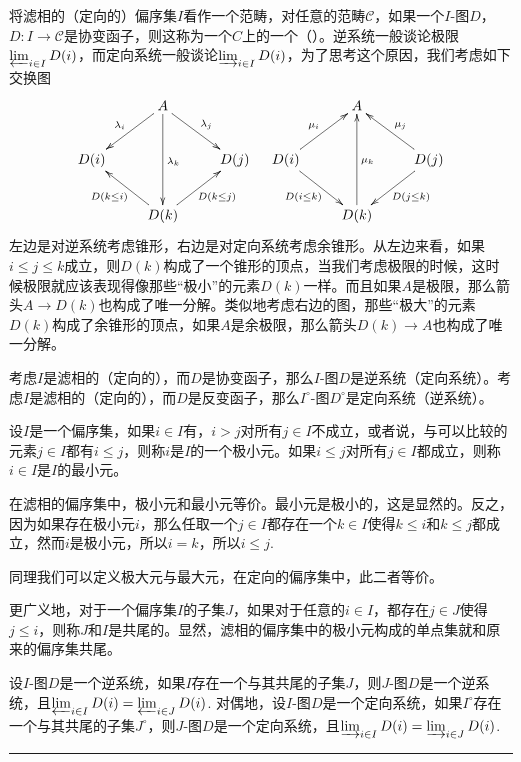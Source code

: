 \para 将滤相的（定向的）偏序集$I$看作一个范畴，对任意的范畴$\mathcal{C}$，如果一个$I$-图$D$，$D:I\to \mathcal{C}$是协变函子，则这称为一个$C$上的一个（）。逆系统一般谈论极限$\varprojlim_{i\in I} D(i)$，而定向系统一般谈论$\varinjlim_{i\in I} D(i)$，为了思考这个原因，我们考虑如下交换图
\[
	\xymatrix{
		&A \ar[dl]_{\lambda_{i}}\ar[dr]^{\lambda_{j}}\ar[dd]^{\lambda_{k}}&\\
		D(i)&&D(j)\\
		&D(k)\ar[ul]^{D(k\leq i)}\ar[ur]_{D(k\leq j)}&
	}
	\quad
	\xymatrix{
		&A &\\
		\ar[ur]^{\mu_{i}}D(i)\ar[dr]_{D(i\leq k)}&&D(j)\ar[ul]_{\mu_{j}}\ar[dl]^{D(j\leq k)}\\
		&D(k)\ar[uu]_{\mu_{k}}&
	}
\]
左边是对逆系统考虑锥形，右边是对定向系统考虑余锥形。从左边来看，如果$i\leq j\leq k$成立，则$D(k)$构成了一个锥形的顶点，当我们考虑极限的时候，这时候极限就应该表现得像那些“极小”的元素$D(k)$一样。而且如果$A$是极限，那么箭头$A\to D(k)$也构成了唯一分解。类似地考虑右边的图，那些“极大”的元素$D(k)$构成了余锥形的顶点，如果$A$是余极限，那么箭头$D(k)\to A$也构成了唯一分解。

\para 考虑$I$是滤相的（定向的），而$D$是协变函子，那么$I$-图$D$是逆系统（定向系统）。考虑$I$是滤相的（定向的），而$D$是反变函子，那么$I^\circ$-图$D^\circ$是定向系统（逆系统）。

\para 设$I$是一个偏序集，如果$i\in I$有，$i>j$对所有$j\in I$不成立，或者说，与可以比较的元素$j\in I$都有$i\leq j$，则称$i$是$I$的一个极小元。如果$i\leq j$对所有$j\in I$都成立，则称$i\in I$是$I$的最小元。

在滤相的偏序集中，极小元和最小元等价。最小元是极小的，这是显然的。反之，因为如果存在极小元$i$，那么任取一个$j\in I$都存在一个$k\in I$使得$k\leq i$和$k\leq j$都成立，然而$i$是极小元，所以$i=k$，所以$i\leq j$.

同理我们可以定义极大元与最大元，在定向的偏序集中，此二者等价。

更广义地，对于一个偏序集$I$的子集$J$，如果对于任意的$i\in I$，都存在$j\in J$使得$j\leq i$，则称$J$和$I$是共尾的。显然，滤相的偏序集中的极小元构成的单点集就和原来的偏序集共尾。

\pro 设$I$-图$D$是一个逆系统，如果$I$存在一个与其共尾的子集$J$，则$J$-图$D$是一个逆系统，且$\varprojlim_{i\in I} D(i)=\varprojlim_{i\in J} D(i)$. 对偶地，设$I$-图$D$是一个定向系统，如果$I^\circ $存在一个与其共尾的子集$J^\circ $，则$J$-图$D$是一个定向系统，且$\varinjlim_{i\in I} D(i)=\varinjlim_{i\in J} D(i)$. \rule{2mm}{2mm}

